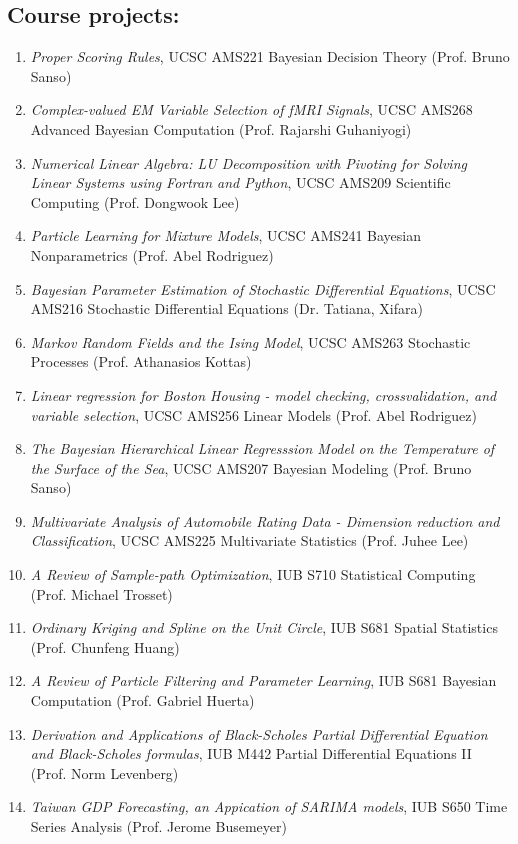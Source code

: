 \documentclass[]{res}
\begin{document}
\begin{resume}
\section{Course projects:}
\begin{enumerate}
	\item \textit{Proper Scoring Rules}, UCSC AMS221 Bayesian Decision Theory (Prof. Bruno Sanso)
	\item \textit{Complex-valued EM Variable Selection of fMRI Signals}, UCSC AMS268 Advanced Bayesian Computation (Prof. Rajarshi Guhaniyogi)
	\item \textit{Numerical Linear Algebra: LU Decomposition with Pivoting for
Solving Linear Systems using Fortran and Python}, UCSC AMS209 Scientific Computing (Prof. Dongwook Lee)
	\item \textit{Particle Learning for Mixture Models}, UCSC AMS241 Bayesian Nonparametrics (Prof. Abel Rodriguez)
	\item \textit{Bayesian Parameter Estimation of Stochastic Differential Equations}, UCSC AMS216 Stochastic Differential Equations (Dr. Tatiana, Xifara)
	\item \textit{Markov Random Fields and the Ising Model}, UCSC AMS263 Stochastic Processes (Prof. Athanasios Kottas)
	\item \textit{Linear regression for Boston Housing - model checking, crossvalidation, and variable selection}, UCSC AMS256 Linear Models (Prof. Abel Rodriguez)
	\item \textit{The Bayesian Hierarchical Linear Regresssion Model on the Temperature of the Surface of the Sea}, UCSC AMS207 Bayesian Modeling (Prof. Bruno Sanso)
	\item \textit{Multivariate Analysis of Automobile Rating Data - Dimension reduction and Classification}, UCSC AMS225 Multivariate Statistics (Prof. Juhee Lee)
	\item \textit{A Review of Sample-path Optimization}, IUB S710 Statistical Computing (Prof. Michael Trosset)
	\item \textit{Ordinary Kriging and Spline on the Unit Circle}, IUB S681 Spatial Statistics (Prof. Chunfeng Huang)
	\item \textit{A Review of Particle Filtering and Parameter Learning}, IUB S681 Bayesian Computation (Prof. Gabriel Huerta)
	\item \textit{Derivation and Applications of Black-Scholes Partial Differential Equation and Black-Scholes formulas}, IUB M442 Partial Differential Equations II (Prof. Norm Levenberg)
	\item \textit{Taiwan GDP Forecasting, an Appication of SARIMA models}, IUB S650 Time Series Analysis (Prof. Jerome Busemeyer)
\end{enumerate}



\end{resume}
\end{document}
